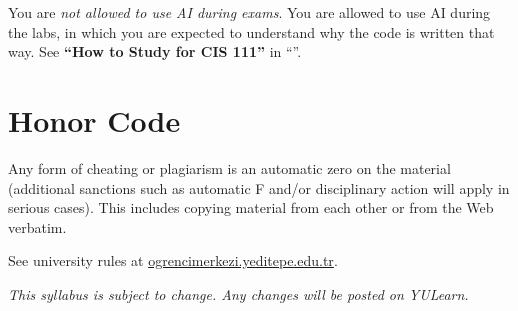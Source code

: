 You are \emph{not allowed to use AI during exams}. 
You are allowed to use AI during the labs,
in which you are expected to understand 
why the code is written that way. 
See \textbf{``How to Study for CIS 111''} in ``\otherResources''.




\section{Honor Code}

Any form of cheating or plagiarism is an automatic zero on the material 
(additional sanctions such as automatic F and/or disciplinary action will apply in serious cases). 
This includes copying material from each other or from the Web verbatim.

See university rules at 
\href{https://ogrencimerkezi.yeditepe.edu.tr/en/student-ethical-principles-responsibilities-and-code-conduct}
	{ogrencimerkezi.yeditepe.edu.tr}.



\vfill
\begin{center}
\textit{This syllabus is subject to change. Any changes will be
posted on YULearn.}
\end{center}

